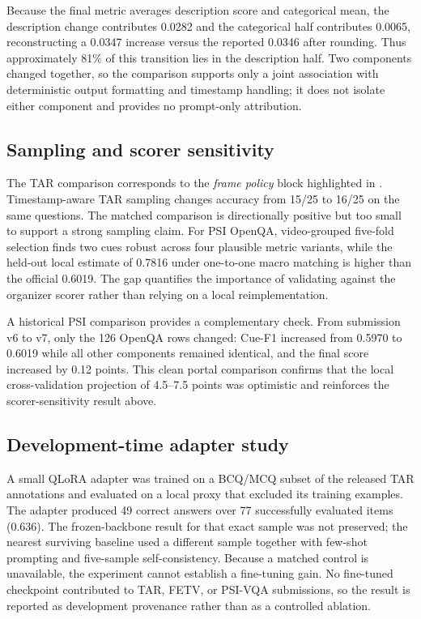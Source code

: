 \documentclass[runningheads]{llncs}
\begin{document}
Because the final metric averages description score and categorical mean, the description change contributes 0.0282 and the categorical half contributes 0.0065, reconstructing a 0.0347 increase versus the reported 0.0346 after rounding. Thus approximately 81\% of this transition lies in the description half. Two components changed together, so the comparison supports only a joint association with deterministic output formatting and timestamp handling; it does not isolate either component and provides no prompt-only attribution.

\subsection{Sampling and scorer sensitivity}
The TAR comparison corresponds to the \emph{frame policy} block highlighted in . Timestamp-aware TAR sampling changes accuracy from 15/25 to 16/25 on the same questions. The matched comparison is directionally positive but too small to support a strong sampling claim. For PSI OpenQA, video-grouped five-fold selection finds two cues robust across four plausible metric variants, while the held-out local estimate of 0.7816 under one-to-one macro matching is higher than the official 0.6019. The gap quantifies the importance of validating against the organizer scorer rather than relying on a local reimplementation.

A historical PSI comparison provides a complementary check. From submission v6 to v7, only the 126 OpenQA rows changed: Cue-F1 increased from 0.5970 to 0.6019 while all other components remained identical, and the final score increased by 0.12 points. This clean portal comparison confirms that the local cross-validation projection of 4.5--7.5 points was optimistic and reinforces the scorer-sensitivity result above.

\subsection{Development-time adapter study}
A small QLoRA adapter was trained on a BCQ/MCQ subset of the released TAR annotations and evaluated on a local proxy that excluded its training examples. The adapter produced 49 correct answers over 77 successfully evaluated items (0.636). The frozen-backbone result for that exact sample was not preserved; the nearest surviving baseline used a different sample together with few-shot prompting and five-sample self-consistency. Because a matched control is unavailable, the experiment cannot establish a fine-tuning gain. No fine-tuned checkpoint contributed to TAR, FETV, or PSI-VQA submissions, so the result is reported as development provenance rather than as a controlled ablation.
\end{document}

